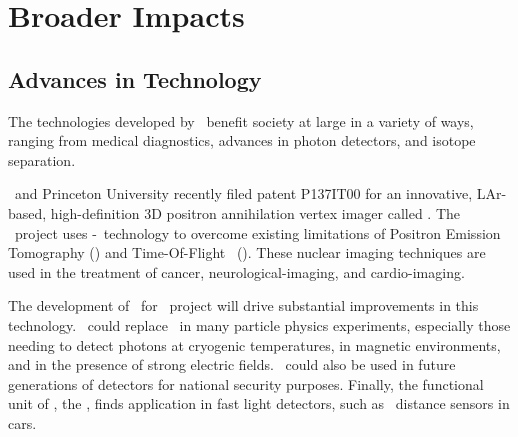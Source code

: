 \section{Broader Impacts}
\label{sec:BroaderImpact}




\subsection{Advances in Technology}

The technologies developed by \GADMC\ benefit society at large in a variety of ways, ranging from medical diagnostics, advances in photon detectors, and isotope separation.

\INFN\ and Princeton University recently filed patent P137IT00 for an innovative, LAr-based, high-definition 3D positron annihilation vertex imager called \ThreeDPi. The \ThreeDPi\ project uses \LAr-\TPC\ technology to overcome existing limitations of Positron Emission Tomography (\PET) and Time-Of-Flight \PET\ (\TOFPET). These nuclear imaging techniques are used in the treatment of cancer, neurological-imaging, and cardio-imaging.  

The development of \SiPMs\ for \DSk\ project will drive substantial improvements in this technology.  \SiPMs\ could replace \PMTs\ in many particle physics experiments, especially those needing to detect photons at cryogenic temperatures, in magnetic environments, and in the presence of strong electric fields. \SiPMs\ could also be used in future generations of detectors for national security purposes. Finally, the functional unit of \SiPMs, the \SPAD, finds application in fast light detectors, such as \LiDaR\ distance sensors in cars.

